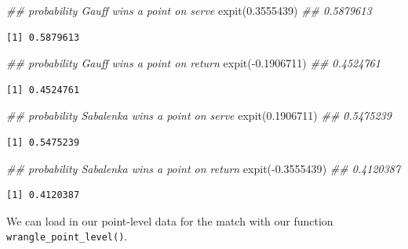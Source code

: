 \documentclass[
  letterpaper,
  DIV=11,
  numbers=noendperiod]{scrartcl}
\newenvironment{Shaded}{\begin{snugshade}}{\end{snugshade}}
\newcommand{\DocumentationTok}[1]{\textcolor[rgb]{0.37,0.37,0.37}{\textit{#1}}}
\newcommand{\FloatTok}[1]{\textcolor[rgb]{0.68,0.00,0.00}{#1}}
\newcommand{\FunctionTok}[1]{\textcolor[rgb]{0.28,0.35,0.67}{#1}}
\newcommand{\NormalTok}[1]{\textcolor[rgb]{0.00,0.23,0.31}{#1}}
\newcommand{\SpecialCharTok}[1]{\textcolor[rgb]{0.37,0.37,0.37}{#1}}
\begin{document}
\linespread{0.9}

\begin{Shaded}
\begin{Highlighting}[]
\DocumentationTok{\#\# probability Gauff wins a point on serve}
\FunctionTok{expit}\NormalTok{(}\FloatTok{0.3555439}\NormalTok{) }\DocumentationTok{\#\# 0.5879613}
\end{Highlighting}
\end{Shaded}

\begin{verbatim}
[1] 0.5879613
\end{verbatim}

\begin{Shaded}
\begin{Highlighting}[]
\DocumentationTok{\#\# probability Gauff wins a point on return}
\FunctionTok{expit}\NormalTok{(}\SpecialCharTok{{-}}\FloatTok{0.1906711}\NormalTok{) }\DocumentationTok{\#\# 0.4524761}
\end{Highlighting}
\end{Shaded}

\begin{verbatim}
[1] 0.4524761
\end{verbatim}

\begin{Shaded}
\begin{Highlighting}[]
\DocumentationTok{\#\# probability Sabalenka wins a point on serve}
\FunctionTok{expit}\NormalTok{(}\FloatTok{0.1906711}\NormalTok{) }\DocumentationTok{\#\# 0.5475239}
\end{Highlighting}
\end{Shaded}

\begin{verbatim}
[1] 0.5475239
\end{verbatim}

\begin{Shaded}
\begin{Highlighting}[]
\DocumentationTok{\#\# probability Sabalenka wins a point on return}
\FunctionTok{expit}\NormalTok{(}\SpecialCharTok{{-}}\FloatTok{0.3555439}\NormalTok{) }\DocumentationTok{\#\# 0.4120387}
\end{Highlighting}
\end{Shaded}

\begin{verbatim}
[1] 0.4120387
\end{verbatim}

\linespread{2}

We can load in our point-level data for the match with our function
\texttt{wrangle\_point\_level()}.
\end{document}
